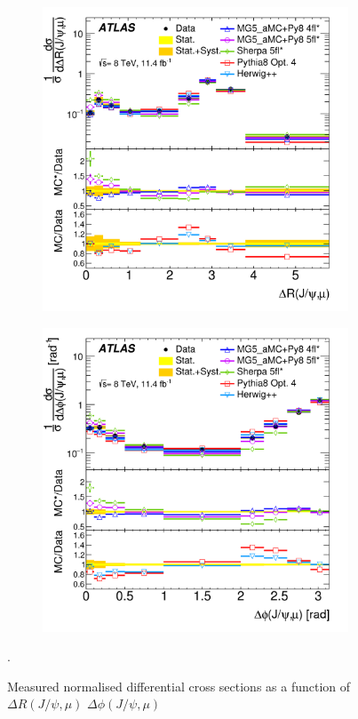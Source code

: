 \documentclass[epj]{webofc}
\begin{document}
\begin{figure}
    \centering
    \begin{subfigure}[H]{0.45\textwidth}
        \includegraphics[width=\textwidth]{plots/bbar/fig_07a.png}
    \end{subfigure}
    \begin{subfigure}[H]{0.45\textwidth}
        \includegraphics[width=\textwidth]{plots/bbar/fig_07b.png}
    \end{subfigure}
    \caption{Measured normalised differential cross sections as a function of $\Delta R (J/\psi, \mu)$ $\Delta \phi (J/\psi, \mu)$}. 
    \label{fig:bbar}
\end{figure}
\end{document}
